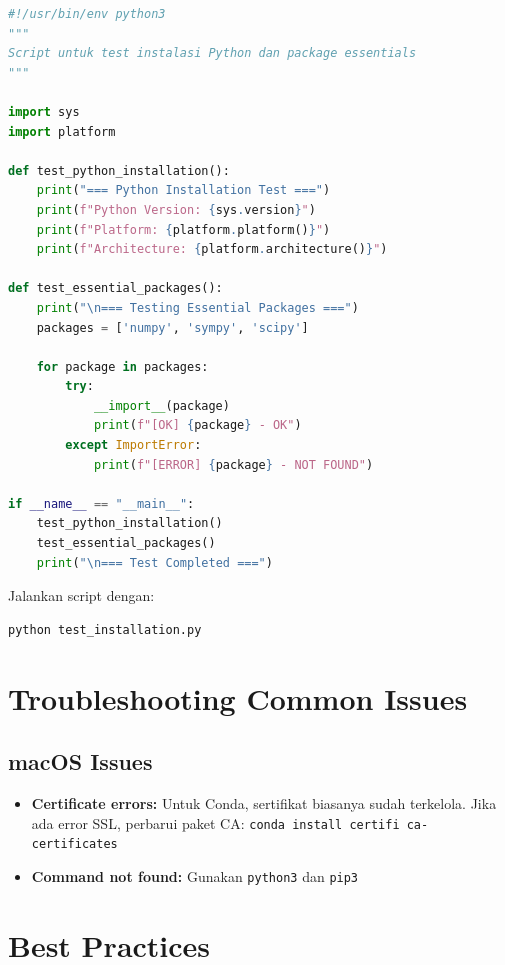 \begin{lstlisting}[language=Python]
#!/usr/bin/env python3
"""
Script untuk test instalasi Python dan package essentials
"""

import sys
import platform

def test_python_installation():
    print("=== Python Installation Test ===")
    print(f"Python Version: {sys.version}")
    print(f"Platform: {platform.platform()}")
    print(f"Architecture: {platform.architecture()}")
    
def test_essential_packages():
    print("\n=== Testing Essential Packages ===")
    packages = ['numpy', 'sympy', 'scipy']
    
    for package in packages:
        try:
            __import__(package)
            print(f"[OK] {package} - OK")
        except ImportError:
            print(f"[ERROR] {package} - NOT FOUND")

if __name__ == "__main__":
    test_python_installation()
    test_essential_packages()
    print("\n=== Test Completed ===")
\end{lstlisting}

Jalankan script dengan:
\begin{lstlisting}[language=bash]
python test_installation.py
\end{lstlisting}

\section{Troubleshooting Common Issues}

\subsection{macOS Issues}
\begin{itemize}
    \item \textbf{Certificate errors:} Untuk Conda, sertifikat biasanya sudah terkelola. Jika ada error SSL, perbarui paket CA: \texttt{conda install certifi ca-certificates}
    \item \textbf{Command not found:} Gunakan \texttt{python3} dan \texttt{pip3}
\end{itemize}

\section{Best Practices}

